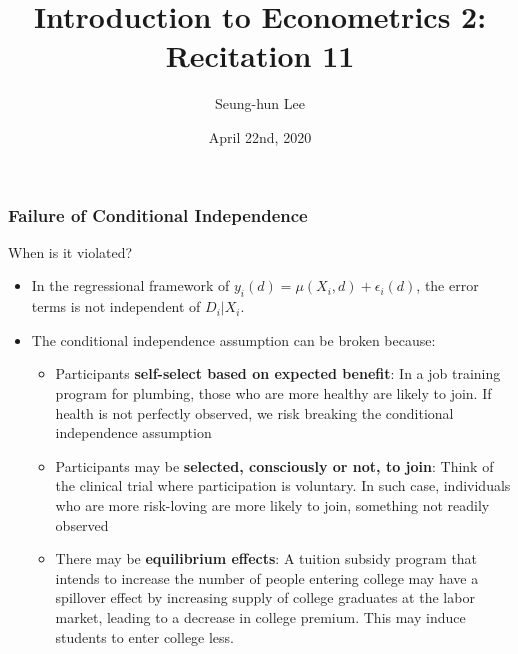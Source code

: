 \documentclass{beamer}
\title[Econometrics 2]{Introduction to Econometrics 2: Recitation 11} %
\author{Seung-hun Lee}
\institute{Columbia University}
\date{April 22nd, 2020}
\begin{document}
\begin{frame}
\titlepage
\end{frame}

\begin{frame}
\frametitle{Failure of Conditional Independence}
When is it violated? 
\begin{itemize}
\item In the regressional framework of $y_{i}(d)=\mu(X_i,d)+\epsilon_i(d)$, the error terms is not independent of $D_i|X_i$.
\item The conditional independence assumption can be broken because:
\begin{itemize}
\item Participants \textbf{self-select based on expected benefit}: In a job training program for plumbing, those who are more healthy are likely to join. If health is not perfectly observed, we risk breaking the conditional independence assumption
\item Participants may be \textbf{selected, consciously or not, to join}: Think of the clinical trial where participation is voluntary. In such case, individuals who are more risk-loving are more likely to join, something not readily observed
\item There may be \textbf{equilibrium effects}: A tuition subsidy program that intends to increase the number of people entering college may have a spillover effect by increasing supply of college graduates at the labor market, leading to a decrease in college premium. This may induce students to enter college less.
\end{itemize}
\end{itemize}
\end{frame}
\end{document}
